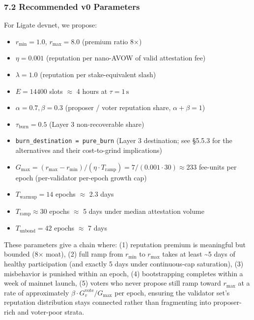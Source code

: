 \documentclass[
  11pt,
]{article}
\providecommand{\tightlist}{%
  \setlength{\itemsep}{0pt}\setlength{\parskip}{0pt}}
\begin{document}
\subsubsection{7.2 Recommended v0
Parameters}\label{recommended-v0-parameters}

For Ligate devnet, we propose:

\begin{itemize}
\tightlist
\item
  \(r_{\min} = 1.0\), \(r_{\max} = 8.0\) (premium ratio 8\(\times\))
\item
  \(\eta = 0.001\) (reputation per nano-AVOW of valid attestation fee)
\item
  \(\lambda = 1.0\) (reputation per stake-equivalent slash)
\item
  \(E = 14400\) slots \(\approx\) 4 hours at \(\tau = 1\,\text{s}\)
\item
  \(\alpha = 0.7, \beta = 0.3\) (proposer / voter reputation share,
  \(\alpha + \beta = 1\))
\item
  \(\tau_{\text{burn}} = 0.5\) (Layer 3 non-recoverable share)
\item
  \texttt{burn\_destination\ =\ pure\_burn} (Layer 3 destination; see
  §5.5.3 for the alternatives and their cost-to-grind implications)
\item
  \(G_{\max} = (r_{\max} - r_{\min}) / (\eta \cdot T_{\text{ramp}}) = 7 / (0.001 \cdot 30) \approx 233\)
  fee-units per epoch (per-validator per-epoch growth cap)
\item
  \(T_{\text{warmup}} = 14\) epochs \(\approx\) 2.3 days
\item
  \(T_{\text{ramp}} \approx 30\) epochs \(\approx\) 5 days under median
  attestation volume
\item
  \(T_{\text{unbond}} = 42\) epochs \(\approx\) 7 days
\end{itemize}

These parameters give a chain where: (1) reputation premium is
meaningful but bounded (8\(\times\) moat), (2) full ramp from
\(r_{\min}\) to \(r_{\max}\) takes at least \textasciitilde5 days of
healthy participation (and exactly 5 days under continuous-cap
saturation), (3) misbehavior is punished within an epoch, (4)
bootstrapping completes within a week of mainnet launch, (5) voters who
never propose still ramp toward \(r_{\max}\) at a rate of approximately
\(\beta \cdot G_v^{\text{vote}} / G_{\max}\) per epoch, ensuring the
validator set's reputation distribution stays connected rather than
fragmenting into proposer-rich and voter-poor strata.
\end{document}
